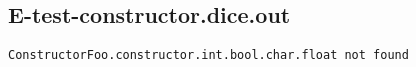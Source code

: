 \subsection{E-test-constructor.dice.out}
\begin{verbatim}
ConstructorFoo.constructor.int.bool.char.float not found

\end{verbatim}